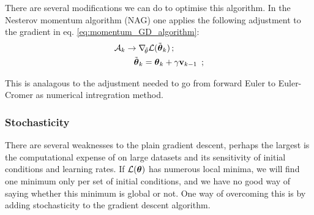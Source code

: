         There are several modifications we can do to optimise this algorithm. In the Nesterov momentum algorithm (NAG) one applies the following adjustment to the gradient in eq. \eqref{eq:momentum_GD_algorithm}:
        \begin{equation}\label{eq:nag}
            \begin{split}
                \mathcal{A}_k &\to\nabla_{\!\tilde{\theta}}\mathcal{L}(\tilde{\svec{\theta}}_k) \, ;\\ 
                & \quad \tilde{\svec{\theta}}_k = \svec{\theta}_k + \gamma\vec{v}_{k-1} \, ;
            \end{split}
        \end{equation}

        This is analagous to the adjustment needed to go from forward Euler to Euler-Cromer as numerical intregration method.

        \fillertext

        
        


        

    \subsubsection{Stochasticity}\label{sec:stochasticity}
        There are several weaknesses to the plain gradient descent, perhaps the largest is the computational expense of on large datasets and its sensitivity of initial conditions and learning rates. If $\mathcal{L}(\boldsymbol{\theta})$ has numerous local minima, we will find one minimum only per set of initial conditions, and we have no good way of saying whether this minimum is global or not. One way of overcoming this is by adding stochasticity to the gradient descent algorithm. 


